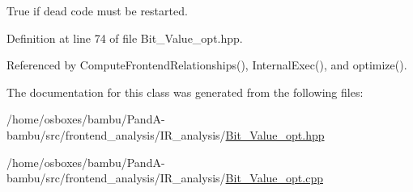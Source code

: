 True if dead code must be restarted. 



Definition at line 74 of file Bit\+\_\+\+Value\+\_\+opt.\+hpp.



Referenced by Compute\+Frontend\+Relationships(), Internal\+Exec(), and optimize().



The documentation for this class was generated from the following files\+:\begin{DoxyCompactItemize}
\item 
/home/osboxes/bambu/\+Pand\+A-\/bambu/src/frontend\+\_\+analysis/\+I\+R\+\_\+analysis/\hyperlink{Bit__Value__opt_8hpp}{Bit\+\_\+\+Value\+\_\+opt.\+hpp}\item 
/home/osboxes/bambu/\+Pand\+A-\/bambu/src/frontend\+\_\+analysis/\+I\+R\+\_\+analysis/\hyperlink{Bit__Value__opt_8cpp}{Bit\+\_\+\+Value\+\_\+opt.\+cpp}\end{DoxyCompactItemize}
